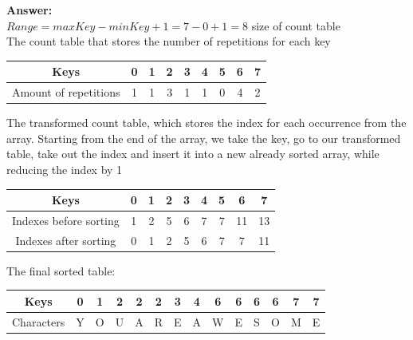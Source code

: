 \documentclass[dvipsnames]{article}
\begin{document}
\begin{enumerate}
    \color{blue}
    \textbf{Answer:}\\
    $Range = maxKey - minKey + 1 = 7 - 0 + 1 = 8$ \text{---} size of count table\\
    The count table that stores the number of repetitions for each key\\
    \begin{center}
    \begin{tabular}{ |c|c|c|c|c|c|c|c|c| }
     \hline
     Keys & 0 & 1 & 2 & 3 & 4 & 5 & 6 & 7 \\
     \hline
     Amount of repetitions & 1 & 1 & 3 & 1 & 1 & 0 & 4 & 2 \\
     \hline
    \end{tabular}
    \end{center}
   The transformed count table, which stores the index for each occurrence from the array. Starting from the end of the array, we take the key, go to our transformed table, take out the index and insert it into a new already sorted array, while reducing the index by 1\\
    \begin{center}
    \begin{tabular}{ |c|c|c|c|c|c|c|c|c| }
     \hline
    Keys & 0 & 1 & 2 & 3 & 4 & 5 & 6 & 7 \\
     \hline
     \hline
     Indexes before sorting & 1 & 2 & 5 & 6 & 7 & 7 & 11 & 13 \\
     \hline
     Indexes after sorting & 0 & 1 & 2 & 5 & 6 & 7 & 7 & 11 \\
     \hline
    \end{tabular}
    \end{center}

    The final sorted table:\\
    
    \begin{center}
    \begin{tabular}{ |c|c|c|c|c|c|c|c|c|c|c|c|c|c| }
     \hline
     Keys & 0 & 1 & 2 & 2 & 2 & 3 & 4 & 6 & 6 & 6 & 6 & 7 & 7  \\
     \hline
     Characters & Y & O & U & A & R & E & A & W & E & S & O & M & E \\
     \hline
    \end{tabular}
    \end{center}
    
    \color{black}


\end{enumerate}
\end{document}
